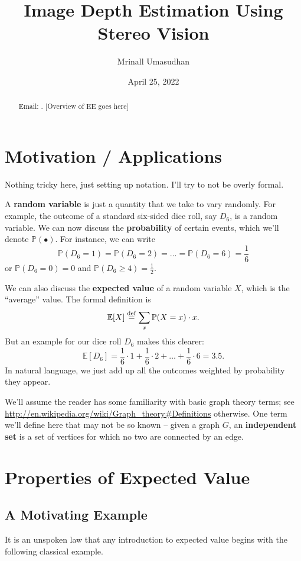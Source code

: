 \documentclass[11pt]{scrartcl}
\newcommand\EE{\mathbb E}
\newcommand\PP{\mathbb P}
\begin{document}
\title{Image Depth Estimation Using Stereo Vision}
\author{Mrinall Umasudhan}
\date{April 25, 2022}
\maketitle
{}

\begin{abstract}
	Email: .
	[Overview of EE goes here]
\end{abstract}

\tableofcontents


\newpage
\section{Motivation / Applications}
Nothing tricky here, just setting up notation.
I'll try to not be overly formal.

A \textbf{random variable} is just a quantity that we take to vary randomly.
For example, the outcome of a standard six-sided dice roll, say $D_6$,
is a random variable.
We can now discuss the \textbf{probability} of certain events, which we'll denote $\PP(\bullet)$.
For instance, we can write
\[ \PP(D_6=1) = \PP(D_6=2) = \dots = \PP(D_6=6) = \frac 16 \]
or $\PP(D_6=0) = 0$ and $\PP (D_6 \ge 4) = \frac 12$.

We can also discuss the \textbf{expected value} of a random variable $X$, which
is the ``average'' value. The formal definition is
\[ \EE[X] \defeq \sum_x \PP(X = x) \cdot x. \]
But an example for our dice roll $D_6$ makes this clearer:
\[ \EE[D_6] = \frac 16 \cdot 1 + \frac 16 \cdot 2 + \dots + \frac 16 \cdot 6 = 3.5. \]
In natural language, we just add up all the outcomes
weighted by probability they appear.

We'll assume the reader has some familiarity with basic graph theory terms;
see \url{http://en.wikipedia.org/wiki/Graph_theory#Definitions} otherwise.
One term we'll define here that may not be so known -- given a graph $G$,
an \textbf{independent set} is a set of vertices for which no two are connected
by an edge.

\section{Properties of Expected Value}
\subsection{A Motivating Example}
It is an unspoken law that any introduction to expected value
begins with the following classical example.
\end{document}
